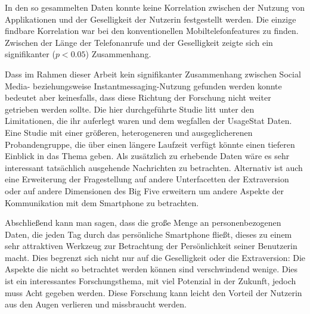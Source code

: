 \par
In den so gesammelten Daten konnte keine Korrelation zwischen der Nutzung von Applikationen und der Geselligkeit der Nutzerin festgestellt werden. 
Die einzige findbare Korrelation war bei den konventionellen Mobiltelefonfeatures zu finden.
Zwischen der Länge der Telefonanrufe und der Geselligkeit zeigte sich ein signifikanter ($p < 0.05$) Zusammenhang.
\par
Dass im Rahmen dieser Arbeit kein signifikanter Zusammenhang zwischen Social Media- beziehungsweise Instantmessaging-Nutzung gefunden werden konnte bedeutet aber keinesfalls,
dass diese Richtung der Forschung nicht weiter getrieben werden sollte.
Die hier durchgeführte Studie litt unter den Limitationen, die ihr auferlegt waren und dem wegfallen der UsageStat Daten.
Eine Studie mit einer größeren, heterogeneren und ausgeglicherenen Probandengruppe, die über einen längere Laufzeit verfügt könnte einen tieferen Einblick in das Thema geben.
Als zusätzlich zu erhebende Daten wäre es sehr interessant tatsächlich ausgehende Nachrichten zu betrachten.
Alternativ ist auch eine Erweiterung der Fragestellung auf andere Unterfacetten der Extraversion oder auf andere Dimensionen des Big Five erweitern um andere Aspekte der Kommunikation mit dem Smartphone zu betrachten.
\par
Abschließend kann man sagen, dass die große Menge an personenbezogenen Daten,
die jeden Tag durch das persönliche Smartphone fließt, dieses zu einem sehr attraktiven Werkzeug zur Betrachtung der Persönlichkeit seiner Benutzerin macht.
Dies begrenzt sich nicht nur auf die Geselligkeit oder die Extraversion: Die Aspekte die nicht so betrachtet werden können sind verschwindend wenige.
Dies ist ein interessantes Forschungsthema, mit viel Potenzial in der Zukunft, jedoch muss Acht gegeben werden.
Diese Forschung kann leicht den Vorteil der Nutzerin aus den Augen verlieren und missbraucht werden. 


